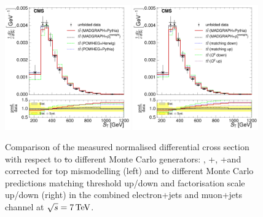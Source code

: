 \begin{figure}[hbtp]
    \centering
     \includegraphics[width=0.48\textwidth]{Chapters/04_Analysis/04b_XSections/images/results/7TeV/ST/central/normalised_xsection_combined_different_generators.pdf}\hfill
     \includegraphics[width=0.48\textwidth]{Chapters/04_Analysis/04b_XSections/images/results/7TeV/ST/central/normalised_xsection_combined_systematics_shifts.pdf}\hfill
     \caption{Comparison of the measured normalised differential cross section with respect to \st to
     different Monte Carlo generators: \MADGRAPH, \POWHEG+\HERWIG, \POWHEG+\PYTHIA and \MADGRAPH corrected for
     top \pt mismodelling (left) and to different Monte Carlo predictions matching threshold up/down and
     factorisation scale up/down (right) in the combined electron+jets and muon+jets channel at
     $\sqrt{s}=7\,\text{Te\hspace{-.08em}V}$.}
     \label{fig:result_ST_7TeV_combined}
\end{figure}


